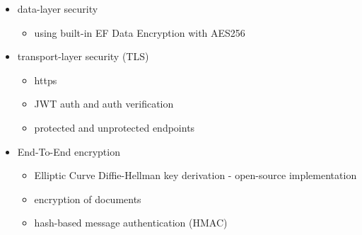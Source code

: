 \begin{itemize}
	\item data-layer security
	\begin{itemize}
		\item using built-in EF Data Encryption with AES256
	\end{itemize}
	\item transport-layer security (TLS)
	\begin{itemize}
		\item https
		\item JWT auth and auth verification
		\item protected and unprotected endpoints
	\end{itemize}
	\item End-To-End encryption
	\begin{itemize}
		\item Elliptic Curve Diffie-Hellman key derivation - open-source implementation
		\item encryption of documents
		\item hash-based message authentication (HMAC)
	\end{itemize}
\end{itemize}